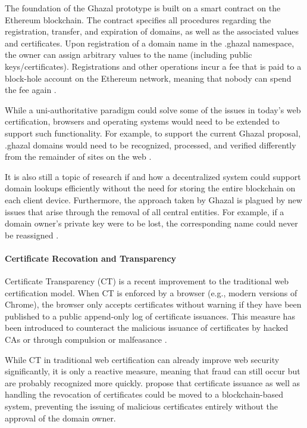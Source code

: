 The foundation of the Ghazal prototype is built on a smart contract on the Ethereum blockchain. The contract specifies all procedures regarding the registration, transfer, and expiration of domains, as well as the associated values and certificates. Upon registration of a domain name in the .ghazal namespace, the owner can assign arbitrary values to the name (including public keys/certificates). Registrations and other operations incur a fee that is paid to a block-hole account on the Ethereum network, meaning that nobody can spend the fee again \cite{zohar_ghazal:_2019}.

While a uni-authoritative paradigm could solve some of the issues in today's web certification, browsers and operating systems would need to be extended to support such functionality. For example, to support the current Ghazal proposal, .ghazal domains would need to be recognized, processed, and verified differently from the remainder of sites on the web \cite{zohar_ghazal:_2019}.

It is also still a topic of research if and how a decentralized system could support domain lookups efficiently without the need for storing the entire blockchain on each client device. Furthermore, the approach taken by Ghazal is plagued by new issues that arise through the removal of all central entities. For example, if a domain owner's private key were to be lost, the corresponding name could never be reassigned \cite{zohar_ghazal:_2019}.

\paragraph{Certificate Recovation and Transparency}

Certificate Transparency (CT) is a recent improvement to the traditional web certification model. When CT is enforced by a browser (e.g., modern versions of Chrome), the browser only accepts certificates without warning if they have been published to a public append-only log of certificate issuances. This measure has been introduced to counteract the malicious issuance of certificates by hacked CAs or through compulsion or malfeasance \cite{zohar_blockchain-based_2019}.

While CT in traditional web certification can already improve web security significantly, it is only a reactive measure, meaning that fraud can still occur but are probably recognized more quickly. \citeauthor{zohar_blockchain-based_2019} propose that certificate issuance as well as handling the revocation of certificates could be moved to a blockchain-based system, preventing the issuing of malicious certificates entirely without the approval of the domain owner.

